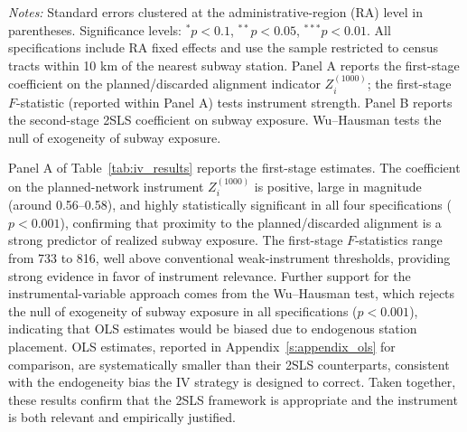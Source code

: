 \begin{table}[htbp]
{{\begin{tabular}{lcccc}
\bottomrule
\end{tabular}
}} %
\begin{tablenotes}
\scriptsize
\item \textit{Notes:} Standard errors clustered at the administrative-region (RA) level in parentheses. Significance levels: $^{*}p<0.1$, $^{**}p<0.05$, $^{***}p<0.01$. All specifications include RA fixed effects and use the sample restricted to census tracts within 10 km of the nearest subway station. Panel A reports the first-stage coefficient on the planned/discarded alignment indicator $Z_i^{(1000)}$; the first-stage $F$-statistic (reported within Panel A) tests instrument strength. Panel B reports the second-stage 2SLS coefficient on subway exposure. Wu--Hausman tests the null of exogeneity of subway exposure.
\end{tablenotes}
\end{table}

Panel A of Table~\ref{tab:iv_results} reports the first-stage estimates. The coefficient on the planned-network instrument $Z_i^{(1000)}$ is positive, large in magnitude (around 0.56--0.58), and highly statistically significant in all four specifications ($p < 0.001$), confirming that proximity to the planned/discarded alignment is a strong predictor of realized subway exposure. The first-stage $F$-statistics range from 733 to 816, well above conventional weak-instrument thresholds, providing strong evidence in favor of instrument relevance. Further support for the instrumental-variable approach comes from the Wu--Hausman test, which rejects the null of exogeneity of subway exposure in all specifications ($p < 0.001$), indicating that OLS estimates would be biased due to endogenous station placement. OLS estimates, reported in Appendix~\ref{s:appendix_ols} for comparison, are systematically smaller than their 2SLS counterparts, consistent with the endogeneity bias the IV strategy is designed to correct. Taken together, these results confirm that the 2SLS framework is appropriate and the instrument is both relevant and empirically justified.

